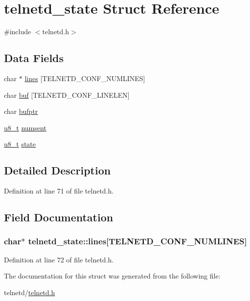 \hypertarget{structtelnetd__state}{
\section{telnetd\_\-state Struct Reference}
\label{structtelnetd__state}
}


{\ttfamily \#include $<$telnetd.h$>$}

\subsection*{Data Fields}
\begin{DoxyCompactItemize}
\item 
char $\ast$ \hyperlink{structtelnetd__state_acca775e46d4405b7775b328f7694f7e7}{lines} \mbox{[}TELNETD\_\-CONF\_\-NUMLINES\mbox{]}
\item 
char \hyperlink{group__apps_ga54a466311575a727830a92a6c3621cb2}{buf} \mbox{[}TELNETD\_\-CONF\_\-LINELEN\mbox{]}
\item 
char \hyperlink{group__apps_ga5eced097547fd3fac4ba2a255493d921}{bufptr}
\item 
\hyperlink{group__uipfw_ga4caecabca98b43919dd11be1c0d4cd8e}{u8\_\-t} \hyperlink{group__apps_gad85fc90c30d1fc37c63c4844be5fe09d}{numsent}
\item 
\hyperlink{group__uipfw_ga4caecabca98b43919dd11be1c0d4cd8e}{u8\_\-t} \hyperlink{group__apps_ga41bf109b6a45328d5744c0a76563fb6c}{state}
\end{DoxyCompactItemize}


\subsection{Detailed Description}


Definition at line 71 of file telnetd.h.



\subsection{Field Documentation}
\hypertarget{structtelnetd__state_acca775e46d4405b7775b328f7694f7e7}{
\subsubsection[{lines}]{\setlength{\rightskip}{0pt plus 5cm}char$\ast$ {\bf telnetd\_\-state::lines}\mbox{[}TELNETD\_\-CONF\_\-NUMLINES\mbox{]}}}
\label{structtelnetd__state_acca775e46d4405b7775b328f7694f7e7}


Definition at line 72 of file telnetd.h.



The documentation for this struct was generated from the following file:\begin{DoxyCompactItemize}
\item 
telnetd/\hyperlink{telnetd_8h}{telnetd.h}\end{DoxyCompactItemize}
